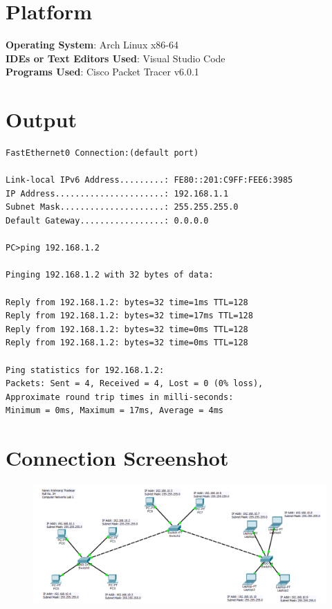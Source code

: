 \documentclass[11pt]{article}
\begin{document}
\section{Platform}
	\textbf{Operating System}: Arch Linux x86-64\\
	\textbf{IDEs or Text Editors Used}: Visual Studio Code\\
	\textbf{Programs Used}: Cisco Packet Tracer v6.0.1

\section{Output}

\begin{lstlisting}
FastEthernet0 Connection:(default port)

Link-local IPv6 Address.........: FE80::201:C9FF:FEE6:3985
IP Address......................: 192.168.1.1
Subnet Mask.....................: 255.255.255.0
Default Gateway.................: 0.0.0.0

PC>ping 192.168.1.2

Pinging 192.168.1.2 with 32 bytes of data:

Reply from 192.168.1.2: bytes=32 time=1ms TTL=128
Reply from 192.168.1.2: bytes=32 time=17ms TTL=128
Reply from 192.168.1.2: bytes=32 time=0ms TTL=128
Reply from 192.168.1.2: bytes=32 time=0ms TTL=128

Ping statistics for 192.168.1.2:
Packets: Sent = 4, Received = 4, Lost = 0 (0% loss),
Approximate round trip times in milli-seconds:
Minimum = 0ms, Maximum = 17ms, Average = 4ms

\end{lstlisting}

\section{Connection Screenshot}


\begin{figure}[H]
	\centering
	\includegraphics[scale=0.47]{../Screenshots/Assignment_1_screenshot.png}
\end{figure}
\end{document}
